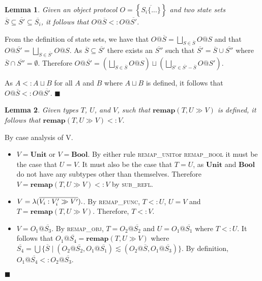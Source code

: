 \documentclass[preprint]{sigplanconf}
\makeatletter
\newtheorem{lem}{Lemma}
\newcommand{\subrefl}{\textsc{sub\_refl}}
\newcommand{\remapunit}{\textsc{remap\_unit}}
\newcommand{\remapbool}{\textsc{remap\_bool}}
\newcommand{\remapfunc}{\textsc{remap\_func}}
\newcommand{\remapobj}{\textsc{remap\_obj}}
\newcommand{\remapapp}[3]{\ensuremath{\mathbf{remap}(#1, #2 \gg #3)}}
\newcommand{\unitt}{\mathbf{Unit}}
\newcommand{\boolt}{\mathbf{Bool}}
\newcommand{\ot}[2]{#1@\overline{#2}}
\newcommand{\funv}[4]{\lambda(\overline{#1 : #2 \gg #3}).#4}
\newcommand{\qed}{$\blacksquare$}
\newenvironment{proof}{\vspace{1ex}\noindent{\bf Proof}\hspace{0.5em}}
  {\hfill\qed\vspace{1ex}}
\makeatother
\begin{document}

\begin{lem}
\label{lem:ssetinc}
Given an object protocol $O = \left\{ \overline{ S_i \{ ... \} } \right\}$ and two state sets 
$\overline{S} \subseteq \overline{S'} \subseteq \overline{S_i}$, it follows
that $O@\overline{S} <: O@\overline{S'}$.
\end{lem}
\begin{proof}
From the definition of state sets, we have that 
$O@\overline{S} = \bigsqcup_{S \in \overline{S}}{O@S}$ and that
$O@\overline{S'} = \bigsqcup_{S \in \overline{S'}}{O@S}$.
As $\overline{S} \subseteq \overline{S'}$ there exists an
$\overline{S''}$ such that $\overline{S'} = \overline{S} \cup \overline{S''}$
where $\overline{S} \cap \overline{S''} = \emptyset$. Therefore
$O@\overline{S'} = \left(\bigsqcup_{S \in \overline{S}}{O@S}\right) \sqcup \left(\bigsqcup_{S' \in \overline{S'} - \overline{S}}{O@S'}\right)$.

As $A <: A \sqcup B$ for all $A$ and $B$ where $A \sqcup B$ is defined, 
it follows that $O@\overline{S} <: O@\overline{S'}$.
\end{proof}


\begin{lem}
\label{lem:remap}
Given types $T$, $U$, and $V$, such that
$\remapapp{T}{U}{V}$ is defined, it follows that $\remapapp{T}{U}{V} <: V$.
\end{lem}
\begin{proof}
By case analysis of V.

\begin{itemize}
\item $V = \unitt$ or $V = \boolt$. By either rule \remapunit or \remapbool
it must be the case that $U = V$. It must also be the case that
$T = U$, as $\unitt$ and $\boolt$ do not have any subtypes other than
themselves. Therefore $V = \remapapp{T}{U}{V} <: V$ by \subrefl.

\item $V = \funv{V_i}{V_i'}{V'}$. By \remapfunc, 
$T <: U$, $U = V$ and $T = \remapapp{T}{U}{V}$. Therefore, $T <: V$.

\item $V = \ot{O_1}{S_3}$. By
\remapobj, $T = \ot{O_2}{S_2}$ and $U = \ot{O_1}{S_1}$
where $T <: U$. It follows that $\ot{O_1}{S_4} = \remapapp{T}{U}{V}$
where 
$\overline{S_4} = \bigcup \{ \overline{S} \mid (\ot{O_2}{S_2}, \ot{O_1}{S_1}) \lesssim (\ot{O_2}{S}, \ot{O_1}{S_3}) \}$. By definition, $\ot{O_1}{S_4} <: \ot{O_2}{S_3}$.

\end{itemize}
\end{proof}
\end{document}
